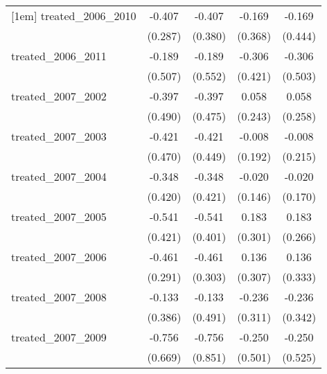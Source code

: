 {\begin{tabular}{l*{4}{c}}
[1em]
treated\_2006\_2010&      -0.407         &      -0.407         &      -0.169         &      -0.169         \\
            &     (0.287)         &     (0.380)         &     (0.368)         &     (0.444)         \\
[1em]
treated\_2006\_2011&      -0.189         &      -0.189         &      -0.306         &      -0.306         \\
            &     (0.507)         &     (0.552)         &     (0.421)         &     (0.503)         \\
[1em]
treated\_2007\_2002&      -0.397         &      -0.397         &       0.058         &       0.058         \\
            &     (0.490)         &     (0.475)         &     (0.243)         &     (0.258)         \\
[1em]
treated\_2007\_2003&      -0.421         &      -0.421         &      -0.008         &      -0.008         \\
            &     (0.470)         &     (0.449)         &     (0.192)         &     (0.215)         \\
[1em]
treated\_2007\_2004&      -0.348         &      -0.348         &      -0.020         &      -0.020         \\
            &     (0.420)         &     (0.421)         &     (0.146)         &     (0.170)         \\
[1em]
treated\_2007\_2005&      -0.541         &      -0.541         &       0.183         &       0.183         \\
            &     (0.421)         &     (0.401)         &     (0.301)         &     (0.266)         \\
[1em]
treated\_2007\_2006&      -0.461         &      -0.461         &       0.136         &       0.136         \\
            &     (0.291)         &     (0.303)         &     (0.307)         &     (0.333)         \\
[1em]
treated\_2007\_2008&      -0.133         &      -0.133         &      -0.236         &      -0.236         \\
            &     (0.386)         &     (0.491)         &     (0.311)         &     (0.342)         \\
[1em]
treated\_2007\_2009&      -0.756         &      -0.756         &      -0.250         &      -0.250         \\
            &     (0.669)         &     (0.851)         &     (0.501)         &     (0.525)         \\

\end{tabular}}
